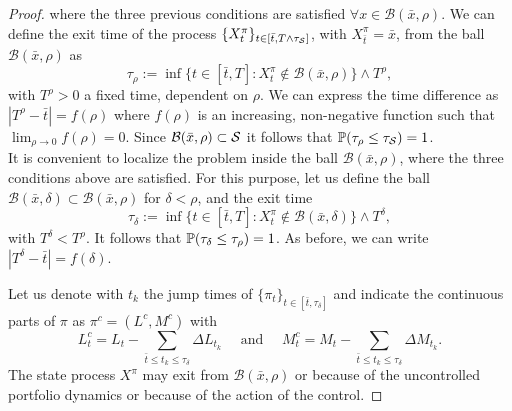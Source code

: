 \begin{proof}
where the three previous conditions are satisfied $\forall x \in \mathcal{B}(\bar x, \rho)$. 
We can define the exit time of the process $\{X^{\pi}_t\}_{t \in [\bar t, T\wedge \tau_{\mathcal{S}}]}$, with $X^{\pi}_{\bar t} = \bar x$, from the ball $\mathcal{B}(\bar x, \rho)$ as
\begin{equation}
 \tau_{\rho} := \inf \{ t \in [\bar t,T] : X^{\pi}_t \not \in \mathcal{B}(\bar x, \rho) \} \wedge T^{\rho},
\end{equation}
with $T^{\rho}>0$ a fixed time, dependent on $\rho$.
We can express the time difference as $| T^{\rho}-\bar t | = f(\rho)$ where $f(\rho)$ is an increasing, non-negative function such that $\lim_{\rho \to 0} f(\rho) = 0$.
Since $\mathcal{B}(\bar x, \rho) \subset \mathcal{S}$ it follows that $\mathbb{P}( \tau_{\rho} \leq \tau_{\mathcal{S}}) =1$.\\

It is convenient to localize the problem inside the ball $\mathcal{B}(\bar x, \rho) $, where the three conditions above are satisfied.
For this purpose, let us define the ball $\mathcal{B}(\bar x, \delta) \subset \mathcal{B}(\bar x, \rho) $ for $\delta < \rho$,
and the exit time
\begin{equation}\label{tau_delta0}
 \tau_{\delta} := \inf \{ t \in [\bar t,T] : X^{\pi}_t \not \in \mathcal{B}(\bar x, \delta) \} \wedge T^{\delta},
\end{equation}
with $T^{\delta} < T^{\rho}$.   
It follows that $\mathbb{P}(\tau_{\delta} \leq \tau_{\rho}) = 1$.
As before, we can write $| T^{\delta}-\bar t | = f(\delta)$.

Let us denote with $t_k$ the jump times of $\{\pi_t\}_{t \in [\bar t, \tau_{\delta}]}$ and indicate the continuous parts of $\pi$ as 
$\pi^c = (L^c, M^c)$ with
\begin{equation}
 L^c_t = L_t - \sum_{\bar t \leq t_k \leq \tau_{\delta}} \Delta L_{t_k} \quad \mbox{ and } \quad  M^c_t = M_t - \sum_{\bar t \leq t_k \leq \tau_{\delta}} \Delta M_{t_k}.
\end{equation}
The state process $X^{\pi}$ may exit from $ \mathcal{B}(\bar x, \rho) $ or because of
the uncontrolled portfolio dynamics or because of the action of the control.


\end{proof}
